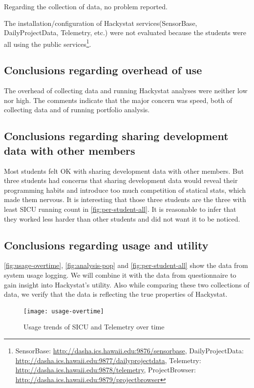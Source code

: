 \documentclass[11pt]{article}
\begin{document}
Regarding the collection of data, no problem reported. 

The installation/configuration of Hackystat services(SensorBase, DailyProjectData, Telemetry, etc.) were not evaluated because the students were all using the public services\footnote{SensorBase: \url{http://dasha.ics.hawaii.edu:9876/sensorbase}, DailyProjectData: \url{http://dasha.ics.hawaii.edu:9877/dailyprojectdata}, Telemetry: \url{http://dasha.ics.hawaii.edu:9878/telemetry}, ProjectBrowser: \url{http://dasha.ics.hawaii.edu:9879/projectbrowser}}.

\subsection {Conclusions regarding overhead of use}
The overhead of collecting data and running Hackystat analyses were neither low nor high. The comments indicate that the major concern was speed, both of collecting data and of running portfolio analysis.

\subsection {Conclusions regarding sharing development data with other members}
Most students felt OK with sharing development data with other members. But three students had concerns that sharing development data would reveal their programming habits and introduce too much competition of statical stats, which made them nervous. It is interesting that those three students are the three with least SICU running count in \autoref{fig:per-student-all}. It is reasonable to infer that they worked less harder than other students and did not want it to be noticed.

\subsection {Conclusions regarding usage and utility}

\autoref{fig:usage-overtime}, \autoref{fig:analysis-pop} and \autoref{fig:per-student-all} show the data from system usage logging. We will combine it with the data from questionnaire to gain insight into Hackystat's utility. Also while comparing these two collections of data, we verify that the data is reflecting the true properties of Hackystat.

\begin{figure}[htbp] %
   \centering
   \texttt{[image: usage-overtime]} 
   \caption{Usage trends of SICU and Telemetry over time}
   \label{fig:usage-overtime}
\end{figure}
\end{document}
